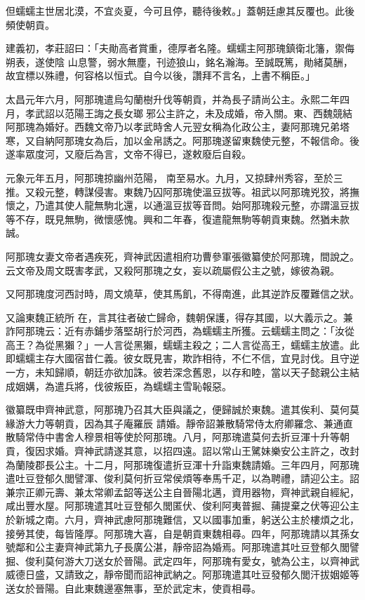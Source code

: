 \begin{pinyinscope}
 但蠕蠕主世居北漠，不宜炎夏，今可且停，聽待後敕。」蓋朝廷慮其反覆也。此後頻使朝貢。



 建義初，孝莊詔曰：「夫勛高者賞重，德厚者名隆。蠕蠕主阿那瑰鎮衛北籓，禦侮朔表，遂使陰
 山息警，弱水無塵，刊迹狼山，銘名瀚海。至誠既篤，勛緒莫酬，故宜標以殊禮，何容格以恒式。自今以後，讚拜不言名，上書不稱臣。」



 太昌元年六月，阿那瑰遣烏勾蘭樹升伐等朝貢，并為長子請尚公主。永熙二年四月，孝武詔以范陽王誨之長女瑯邪公主許之，未及成婚，帝入關。東、西魏競結阿那瑰為婚好。西魏文帝乃以孝武時舍人元翌女稱為化政公主，妻阿那瑰兄弟塔寒，又自納阿那瑰女為后，加以金帛誘之。阿那瑰遂留東魏使元整，不報信命。後遂率眾度河，又廢后為言，文帝不得已，遂敕廢后自殺。



 元象元年五月，阿那瑰掠幽州范陽，
 南至易水。九月，又掠肆州秀容，至於三推。又殺元整，轉謀侵害。東魏乃囚阿那瑰使溫豆拔等。祖武以阿那瑰兇狡，將撫懷之，乃遣其使人龍無駒北還，以通溫豆拔等音問。始阿那瑰殺元整，亦謂溫豆拔等不存，既見無駒，微懷感愧。興和二年春，復遣龍無駒等朝貢東魏。然猶未款誠。



 阿那瑰女妻文帝者遇疾死，齊神武因遣相府功曹參軍張徽纂使於阿那瑰，間說之。云文帝及周文既害孝武，又殺阿那瑰之女，妄以疏屬假公主之號，嫁彼為親。



 又阿那瑰度河西討時，周文燒草，使其馬飢，不得南進，此其逆詐反覆難信之狀。



 又論東魏正統所
 在，言其往者破亡歸命，魏朝保護，得存其國，以大義示之。兼詐阿那瑰云：近有赤鋪步落堅胡行於河西，為蠕蠕主所獲。云蠕蠕主問之：「汝從高王？為從黑獺？」一人言從黑獺，蠕蠕主殺之；二人言從高王，蠕蠕主放遣。此即蠕蠕主存大國宿昔仁義。彼女既見害，欺詐相待，不仁不信，宜見討伐。且守逆一方，未知歸順，朝廷亦欲加誅。彼若深念舊恩，以存和睦，當以天子懿親公主結成姻媾，為遣兵將，伐彼叛臣，為蠕蠕主雪恥報惡。



 徽纂既申齊神武意，阿那瑰乃召其大臣與議之，便歸誠於東魏。遣其俟利、莫何莫緣游大力等朝貢，因為其子庵羅辰
 請婚。靜帝詔兼散騎常侍太府卿羅念、兼通直散騎常侍中書舍人穆景相等使於阿那瑰。八月，阿那瑰遣莫何去折豆渾十升等朝貢，復因求婚。齊神武請遂其意，以招四遠。詔以常山王騭妹樂安公主許之，改封為蘭陵郡長公主。十二月，阿那瑰復遣折豆渾十升詣東魏請婚。三年四月，阿那瑰遣吐豆登郁久閭譬渾、俊利莫何折豆常侯煩等奉馬千疋，以為聘禮，請迎公主。詔兼宗正卿元壽、兼太常卿孟韶等送公主自晉陽北邁，資用器物，齊神武親自經紀，咸出豐水屋。阿那瑰遣其吐豆登郁久閭匿伏、俊利阿夷普掘、蒱提棄之伏等迎公主
 於新城之南。六月，齊神武慮阿那瑰難信，又以國事加重，躬送公主於樓煩之北，接勞其使，每皆隆厚。阿那瑰大喜，自是朝貢東魏相尋。四年，阿那瑰請以其孫女號鄰和公主妻齊神武第九子長廣公湛，靜帝詔為婚焉。阿那瑰遣其吐豆登郁久閭譬掘、俊利莫何游大刀送女於晉陽。武定四年，阿那瑰有愛女，號為公主，以齊神武威德日盛，又請致之，靜帝聞而詔神武納之。阿那瑰遣其吐豆發郁久閭汗拔姻姬等送女於晉陽。自此東魏邊塞無事，至於武定末，使貢相尋。




\end{pinyinscope}
